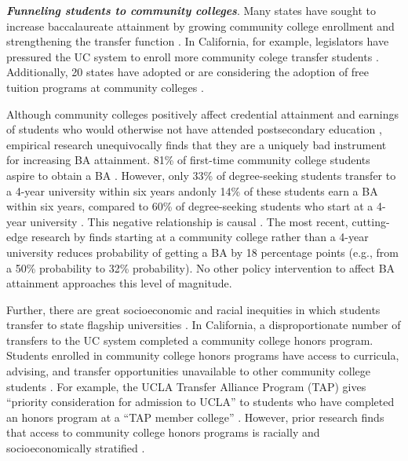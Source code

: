 \documentclass[twoside]{article}
\begin{document}

\textbf{\textit{Funneling students to community colleges}}. Many states have sought to increase baccalaureate attainment by growing community college enrollment and strengthening the transfer function \citep{RN4430,RN4431}. In California, for example, legislators have pressured the UC system to enroll more community colege transfer students \citep{RN4427}. Additionally, 20 states have adopted or are considering the adoption of free tuition programs at community colleges \citep{RN4425,RN4426}.




Although community colleges positively affect credential attainment and earnings of students who would otherwise not have attended postsecondary education \citep[e.g., ][]{RN4404}, empirical research unequivocally finds that they are a uniquely bad instrument for increasing BA attainment. 81\% of first-time community college students aspire to obtain a BA \citep{RN4406}. However, only 33\% of degree-seeking students transfer to a 4-year university within six years \citep{RN4406} andonly 14\% of these students earn a BA within six years, compared to 60\% of degree-seeking students who start at a 4-year university \citep{RN4406}.  This negative relationship is causal \citep[e.g., ][]{RN4284,RN2261,RN4292,RN4405}. The most recent, cutting-edge research by \cite{RN4404} finds starting at a community college rather than a 4-year university reduces probability of getting a BA by 18 percentage points (e.g., from a 50\% probability to 32\% probability).  No other policy intervention to affect BA attainment approaches this level of magnitude.

Further, there are great socioeconomic and racial inequities in which students transfer to state flagship universities \citep{RN1492,RN4406}. In California, a disproportionate number of transfers to the UC system completed a community college honors program. Students enrolled in community college honors programs have access to curricula, advising, and transfer opportunities unavailable to other community college students \citep{RN4444,RN4443}. For example, the UCLA Transfer Alliance Program (TAP) gives ``priority consideration for admission to UCLA'' to students who have completed an honors program at a ``TAP member college'' \citep{RN4432}. However, prior research finds that access to community college honors programs is racially and socioeconomically stratified \citep{RN4440,RN4441,RN4445}.
\end{document}
